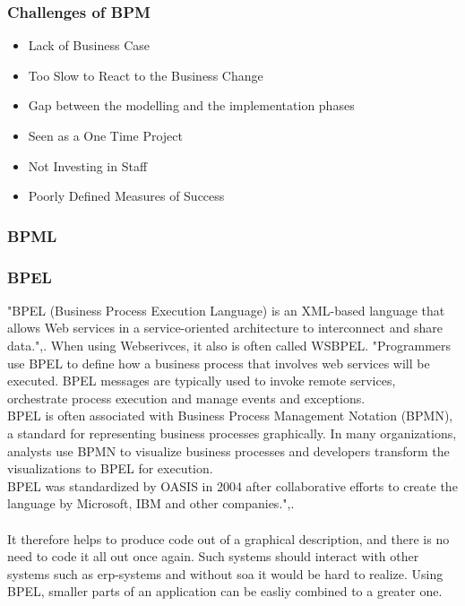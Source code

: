 \documentclass[12pt]{article}
\begin{document}
\subsubsection{Challenges of BPM \cite{bpmchall}}
\begin{itemize}
\item Lack of Business Case
\item Too Slow to React to the Business Change
\item Gap between the modelling and the implementation phases
\item Seen as a One Time Project 
\item Not Investing in Staff
\item Poorly Defined Measures of Success 
\end{itemize}
\subsubsection{BPML}
\subsubsection{BPEL}
\label{sec:bpel}
"BPEL (Business Process Execution Language) is an XML-based language that allows Web services in a service-oriented architecture to interconnect and share data.",\cite{bpelsearchsoa}. When using Webserivces, it also is often called WSBPEL. "Programmers use BPEL to define how a business process that involves web services will be executed. BPEL messages are typically used to invoke remote services, orchestrate process execution and manage events and exceptions.\\
BPEL is often associated with Business Process Management Notation (BPMN), a standard for representing business processes graphically. In many organizations, analysts use BPMN to visualize business processes and developers transform the visualizations to BPEL for execution.\\
BPEL was standardized by OASIS in 2004 after collaborative efforts to create the language by Microsoft, IBM and other companies.",\cite{bpelsearchsoa}.\\
\\
It therefore helps to produce code out of a graphical description, and there is no need to code it all out once again. Such systems should interact with other systems such as \gls{erp}-systems and without \gls{soa} it would be hard to realize. Using BPEL, smaller parts of an application can be easliy combined to a greater one. \cite[page 18]{soagoesreal}
\end{document}
